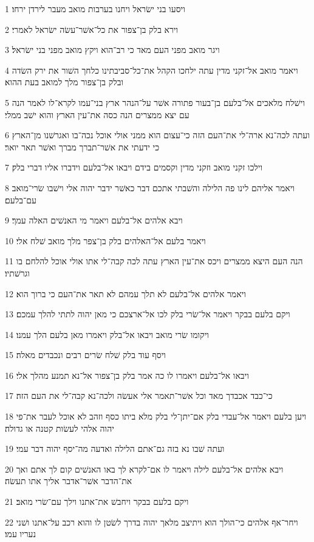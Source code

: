 \par 1 ויסעו בני ישׂראל ויחנו בערבות מואב מעבר לירדן ירחו׃
\par 2 וירא בלק בן־צפור את כל־אשׁר־עשׂה ישׂראל לאמרי׃
\par 3 ויגר מואב מפני העם מאד כי רב־הוא ויקץ מואב מפני בני ישׂראל׃
\par 4 ויאמר מואב אל־זקני מדין עתה ילחכו הקהל את־כל־סביבתינו כלחך השׁור את ירק השׂדה ובלק בן־צפור מלך למואב בעת ההוא׃
\par 5 וישׁלח מלאכים אל־בלעם בן־בעור פתורה אשׁר על־הנהר ארץ בני־עמו לקרא־לו לאמר הנה עם יצא ממצרים הנה כסה את־עין הארץ והוא ישׁב ממלי׃
\par 6 ועתה לכה־נא ארה־לי את־העם הזה כי־עצום הוא ממני אולי אוכל נכה־בו ואגרשׁנו מן־הארץ כי ידעתי את אשׁר־תברך מברך ואשׁר תאר יואר׃
\par 7 וילכו זקני מואב וזקני מדין וקסמים בידם ויבאו אל־בלעם וידברו אליו דברי בלק׃
\par 8 ויאמר אליהם לינו פה הלילה והשׁבתי אתכם דבר כאשׁר ידבר יהוה אלי וישׁבו שׂרי־מואב עם־בלעם׃
\par 9 ויבא אלהים אל־בלעם ויאמר מי האנשׁים האלה עמך׃
\par 10 ויאמר בלעם אל־האלהים בלק בן־צפר מלך מואב שׁלח אלי׃
\par 11 הנה העם היצא ממצרים ויכס את־עין הארץ עתה לכה קבה־לי אתו אולי אוכל להלחם בו וגרשׁתיו׃
\par 12 ויאמר אלהים אל־בלעם לא תלך עמהם לא תאר את־העם כי ברוך הוא׃
\par 13 ויקם בלעם בבקר ויאמר אל־שׂרי בלק לכו אל־ארצכם כי מאן יהוה לתתי להלך עמכם׃
\par 14 ויקומו שׂרי מואב ויבאו אל־בלק ויאמרו מאן בלעם הלך עמנו׃
\par 15 ויסף עוד בלק שׁלח שׂרים רבים ונכבדים מאלה׃
\par 16 ויבאו אל־בלעם ויאמרו לו כה אמר בלק בן־צפור אל־נא תמנע מהלך אלי׃
\par 17 כי־כבד אכבדך מאד וכל אשׁר־תאמר אלי אעשׂה ולכה־נא קבה־לי את העם הזה׃
\par 18 ויען בלעם ויאמר אל־עבדי בלק אם־יתן־לי בלק מלא ביתו כסף וזהב לא אוכל לעבר את־פי יהוה אלהי לעשׂות קטנה או גדולה׃
\par 19 ועתה שׁבו נא בזה גם־אתם הלילה ואדעה מה־יסף יהוה דבר עמי׃
\par 20 ויבא אלהים אל־בלעם לילה ויאמר לו אם־לקרא לך באו האנשׁים קום לך אתם ואך את־הדבר אשׁר־אדבר אליך אתו תעשׂה׃
\par 21 ויקם בלעם בבקר ויחבשׁ את־אתנו וילך עם־שׂרי מואב׃
\par 22 ויחר־אף אלהים כי־הולך הוא ויתיצב מלאך יהוה בדרך לשׂטן לו והוא רכב על־אתנו ושׁני נעריו עמו׃
